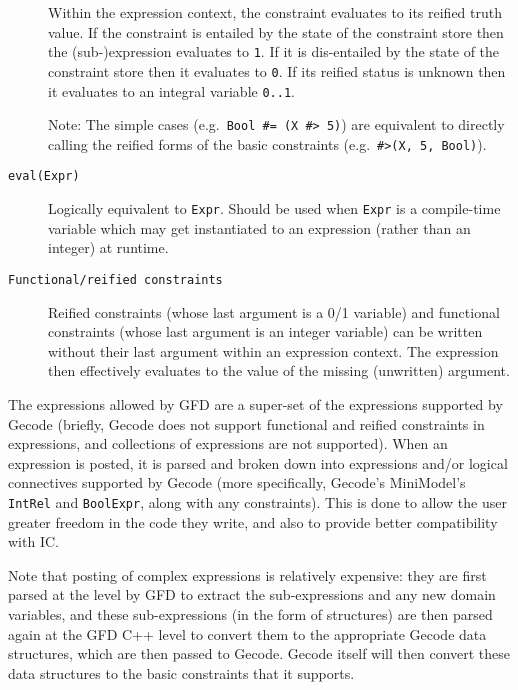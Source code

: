 \begin{description}
    Within the expression context, the constraint evaluates to its
    reified truth value.  If the constraint is entailed by the
    state of the constraint store then the (sub-)expression
    evaluates to \verb|1|.  If it is dis-entailed by the state of
    the constraint store then it evaluates to \verb|0|. If its
    reified status is unknown then it evaluates to an integral
    variable \verb|0..1|.

    Note: The simple cases (e.g.\ \verb|Bool #= (X #> 5)|) are
    equivalent to directly calling the reified forms of the basic
    constraints (e.g.\ \verb|#>(X, 5, Bool)|).

\item[\texttt{eval(Expr)}]
            Logically equivalent to \verb'Expr'.
	    Should be used when \verb'Expr' is a compile-time variable
	    which may get instantiated to an expression (rather than an
	    integer) at runtime.

\item[\texttt{Functional/reified constraints}]
	    Reified constraints (whose last argument is a 0/1 variable)
	    and functional constraints (whose last argument is an integer
	    variable) can be written without their last argument within
	    an expression context.  The expression then effectively
	    evaluates to the value of the missing (unwritten) argument.

\end{description}
 
The expressions allowed by GFD are a super-set of the expressions supported by 
Gecode (briefly, Gecode does not support functional and 
reified constraints in expressions, and collections of expressions are not 
supported). When an expression is posted, it is parsed and broken down into 
expressions and/or logical connectives supported by Gecode (more 
specifically, Gecode's MiniModel's {\tt IntRel} and {\tt BoolExpr}, along 
with any constraints). This is done to 
allow the user greater freedom in the code they write, and also to provide 
better compatibility with IC. 

Note that posting of complex expressions is relatively expensive: they are 
first parsed at the {\eclipse} level by GFD to extract the sub-expressions and 
any new domain variables, and these sub-expressions (in the form of 
{\eclipse} structures) are then parsed again at the GFD C++ level to convert
them to the appropriate Gecode data structures, which are then passed to
Gecode. Gecode itself will then convert these data structures
to the basic constraints that it supports. 


